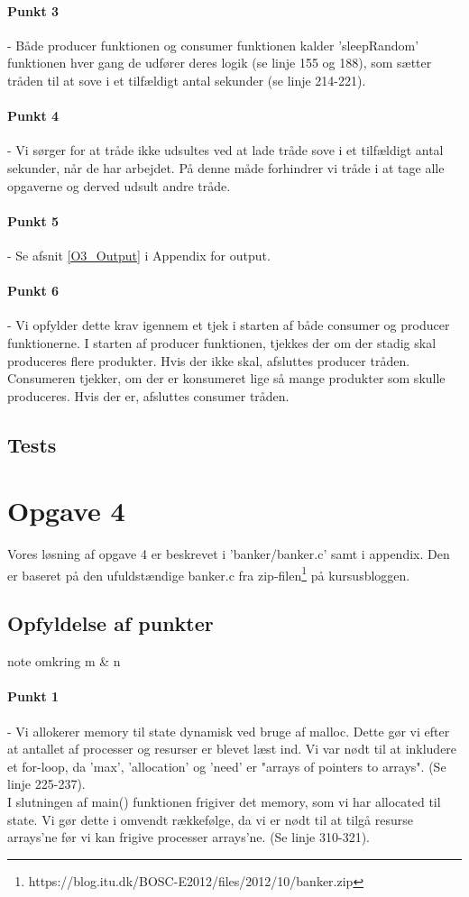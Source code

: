 \paragraph{Punkt 3} - Både producer funktionen og consumer funktionen kalder 'sleepRandom' funktionen hver gang de udfører deres logik (se linje 155 og 188), som sætter tråden til at sove i et tilfældigt antal sekunder (se linje 214-221).
\paragraph{Punkt 4} - Vi sørger for at tråde ikke udsultes ved at lade tråde sove i et tilfældigt antal sekunder, når de har arbejdet. På denne måde forhindrer vi tråde i at tage alle opgaverne og derved udsult andre tråde.
\paragraph{Punkt 5} - Se afsnit \ref{O3_Output} i Appendix for output.
\paragraph{Punkt 6} - Vi opfylder dette krav igennem et tjek i starten af både consumer og producer funktionerne. I starten af producer funktionen, tjekkes der om der stadig skal produceres flere produkter. Hvis der ikke skal, afsluttes producer tråden. Consumeren tjekker, om der er konsumeret lige så mange produkter som skulle produceres. Hvis der er, afsluttes consumer tråden.
\subsection{Tests}
\label{O3_Tests}

\section{Opgave 4}
\label{O4}
Vores løsning af opgave 4 er beskrevet i 'banker/banker.c' samt i appendix. Den er baseret på den ufuldstændige banker.c fra zip-filen\footnote{https://blog.itu.dk/BOSC-E2012/files/2012/10/banker.zip} på kursusbloggen.
\subsection{Opfyldelse af punkter}
note omkring m & n
\label{O4_Punkter}
\paragraph{Punkt 1} - Vi allokerer memory til state dynamisk ved bruge af malloc. Dette gør vi efter at antallet af processer og resurser er blevet læst ind. Vi var nødt til at inkludere et for-loop, da 'max', 'allocation' og 'need' er "arrays of pointers to arrays".  (Se linje 225-237).
\\I slutningen af main() funktionen frigiver det memory, som vi har allocated til state. Vi gør dette i omvendt rækkefølge, da vi er nødt til at tilgå resurse arrays'ne før vi kan frigive processer arrays'ne. (Se linje 310-321).
